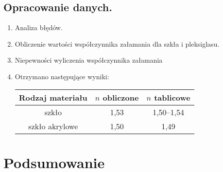 \documentclass [a4paper,11pt]{article}
\begin{document}
	\subsection{Opracowanie danych.}\label{sec:drm}
	\begin{enumerate}[label=\alph*)]
		
		\item Analiza błędów.
		
		
		\item Obliczenie wartości współczynnika załamania dla szkła i pleksiglasu.
	
		
		\item Niepewności wyliczenia współczynnika załamania
		
		
		\item Otrzymano następujące wyniki:
		\begin{center}
			\begin{tabular}{|c|c|c|}
				\hline Rodzaj materiału & $n$ obliczone & $n$ tablicowe \\
				\hline szkło & 1,53 & 1,50–1,54 \\
				\hline szkło akrylowe & 1,50 & 1,49 \\  
				\hline 
			\end{tabular} 
		\end{center}

	
	\end{enumerate}
	
	\section{Podsumowanie}
	\begin{center}
	
	\end{center}
\vspace{1em}
\end{document}
